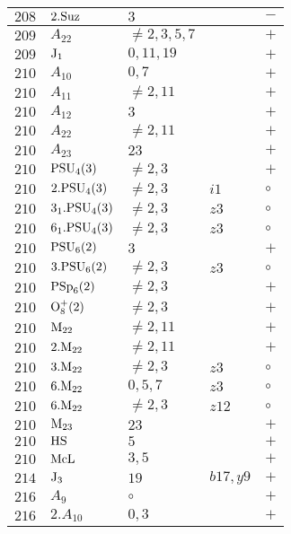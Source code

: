 \documentclass[a4paper, 11pt]{article}
\begin{document}
\begin{longtable}{lllll}
		$208$ & $2.{\rm Suz}$ & $3$ &  & $-$ \\ \hline
		$209$ & $A_{22}$ & $\neq 2,3,5,7$ &  & $+$ \\ \hline
		$209$ & ${\rm J}_1$ & $0, 11, 19$ &  & $+$ \\ \hline
		$210$ & $A_{10}$ & $0,7$ &  & $+$ \\ \hline
		$210$ & $A_{11}$ & $\neq 2,11$ &  & $+$ \\ \hline
		$210$ & $A_{12}$ & $3$ &  & $+$ \\ \hline
		$210$ & $A_{22}$ & $\neq 2,11$ &  & $+$ \\ \hline
		$210$ & $A_{23}$ & $23$ &  & $+$ \\ \hline
		$210$ & ${\rm PSU}_{4}(3)$ & $\neq 2,3$ &  & $+$ \\ \hline
		$210$ & $2.{\rm PSU}_{4}(3)$ & $\neq 2,3$ & $i1$ & $\circ$ \\ \hline
		$210$ & $3_1.{\rm PSU}_{4}(3)$ & $\neq 2,3$ & $z3$ & $\circ$ \\ \hline
		$210$ & $6_1.{\rm PSU}_{4}(3)$ & $\neq 2,3$ & $z3$ & $\circ$ \\ \hline
		$210$ & ${\rm PSU}_{6}(2)$ & $3$ &  & $+$ \\ \hline
		$210$ & $3.{\rm PSU}_{6}(2)$ & $\neq 2,3$ & $z3$ & $\circ$ \\ \hline
		$210$ & ${\rm PSp}_{6}(2)$ & $\neq 2,3$ &  & $+$ \\ \hline
		$210$ & ${\rm O}_{8}^+(2)$ & $\neq 2,3$ &  & $+$ \\ \hline
		$210$ & ${\rm M}_{22}$ & $\neq 2,11$ &  & $+$ \\ \hline
		$210$ & $2.{\rm M}_{22}$ & $\neq 2,11$ &  & $+$ \\ \hline
		$210$ & $3.{\rm M}_{22}$ & $\neq 2,3$ & $z3$ & $\circ$ \\ \hline
		$210$ & $6.{\rm M}_{22}$ & $0,5,7$ & $z3$ & $\circ$ \\ \hline
		$210$ & $6.{\rm M}_{22}$ & $\neq 2,3$ & $z12$ & $\circ$ \\ \hline
		$210$ & ${\rm M}_{23}$ & $23$ &  & $+$ \\ \hline
		$210$ & ${\rm HS}$ & $5$ &  & $+$ \\ \hline
		$210$ & ${\rm McL}$ & $3,5$ &  & $+$ \\ \hline
		$214$ & ${\rm J}_3$ & $19$ & $b17, y9$ & $+$ \\ \hline
		$216$ & $A_{9}$ & $\circ$ &  & $+$ \\ \hline
		$216$ & $2.A_{10}$ & $0,3$ &  & $+$ \\ \hline

\end{longtable}
\end{document}
